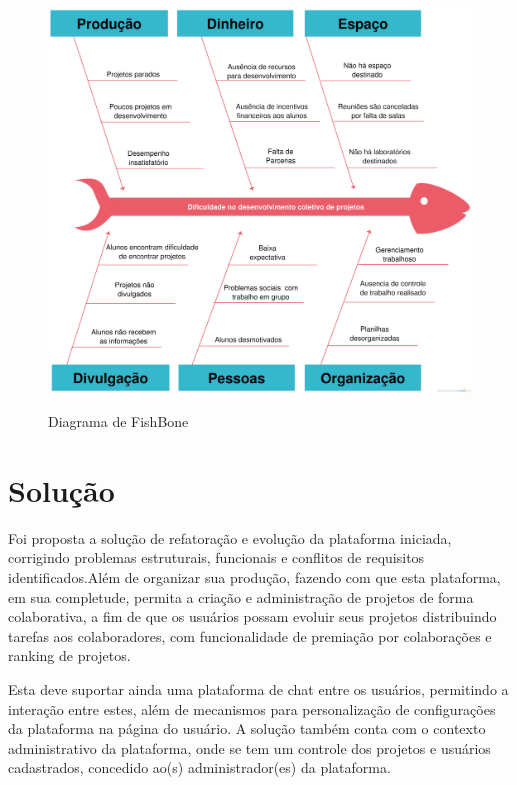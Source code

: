 \FloatBarrier
\begin{figure}[!htpd]
		\centering
		\includegraphics[scale=0.15]{figuras/problema}
		\label{img:problema}
		\caption{Diagrama de FishBone}
\end{figure}
\FloatBarrier

\section {Solução}

Foi proposta a solução de refatoração e evolução da plataforma iniciada, corrigindo problemas estruturais, funcionais e conflitos de requisitos identificados.Além de organizar sua produção, fazendo com que esta plataforma, em sua completude, permita a criação e administração de projetos de forma colaborativa, a fim de que os usuários possam evoluir seus projetos distribuindo tarefas aos colaboradores, com funcionalidade de premiação por colaborações e ranking de projetos.

Esta deve suportar ainda uma plataforma de chat entre os usuários, permitindo a interação entre estes, além de mecanismos para personalização de configurações da plataforma na página do usuário. A solução também conta com o contexto administrativo da plataforma, onde se tem um controle dos projetos e usuários cadastrados, concedido ao(s) administrador(es) da plataforma.
